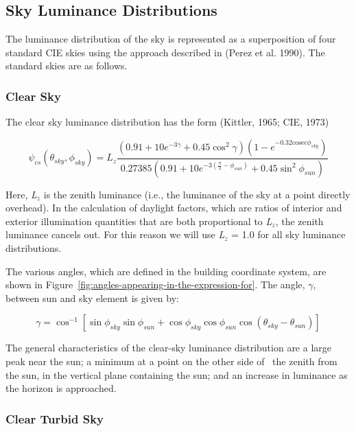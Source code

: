 \subsection{Sky Luminance Distributions}\label{sky-luminance-distributions}

The luminance distribution of the sky is represented as a superposition of four standard CIE skies using the approach described in (Perez et al. 1990). The standard skies are as follows.

\subsubsection{Clear Sky}\label{clear-sky}

The clear sky luminance distribution has the form (Kittler, 1965; CIE, 1973)

\begin{equation}
{\psi_{cs}}({\theta_{sky}},{\phi_{sky}}) = {L_z}\frac{{(0.91 + 10{e^{ - 3\gamma }} + 0.45{{\cos }^2}\gamma )(1 - {e^{ - 0.32{\mathrm{cosec}}{\phi_{sky}}}})}}{{0.27385(0.91 + 10{e^{ - 3(\frac{\pi }{2} - {\phi_{sun}})}} + 0.45{{\sin }^2}{\phi_{sun}})}}
\end{equation}

Here, \emph{L\(_{z}\)} is the zenith luminance (i.e., the luminance of the sky at a point directly overhead). In the calculation of daylight factors, which are ratios of interior and exterior illumination quantities that are both proportional to \emph{L\(_{z}\)}, the zenith luminance cancels out. For this reason we will use \emph{L\(_{z}\)} = 1.0 for all sky luminance distributions.

The various angles, which are defined in the building coordinate system, are shown in Figure~\ref{fig:angles-appearing-in-the-expression-for}. The angle, $\gamma$, between sun and sky element is given by:

\begin{equation}
\gamma  = {\cos ^{ - 1}}\left[ {\sin {\phi_{sky}}\sin {\phi_{sun}} + \cos {\phi_{sky}}\cos {\phi_{sun}}\cos ({\theta_{sky}} - {\theta_{sun}})} \right]
\end{equation}

The general characteristics of the clear-sky luminance distribution are a large peak near the sun; a minimum at a point on the other side of~ the zenith from the sun, in the vertical plane containing the sun; and an increase in luminance as the horizon is approached.

\subsubsection{Clear Turbid Sky}\label{clear-turbid-sky}

